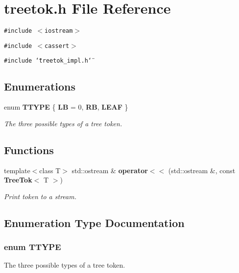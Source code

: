 \section{treetok.h File Reference}
\label{treetok_8h}
{\tt \#include $<$iostream$>$}\par
{\tt \#include $<$cassert$>$}\par
{\tt \#include \char`\"{}treetok\_\-impl.h\char`\"{}}\par
\subsection*{Enumerations}
\begin{CompactItemize}
\item 
enum {\bf TTYPE} \{ {\bf LB} =  0, 
{\bf RB}, 
{\bf LEAF}
 \}
\begin{CompactList}\small\item\em The three possible types of a tree token. \item\end{CompactList}\end{CompactItemize}
\subsection*{Functions}
\begin{CompactItemize}
\item 
template$<$class T$>$ std::ostream \& {\bf operator$<$$<$} (std::ostream \&, const {\bf Tree\-Tok}$<$ T $>$)
\begin{CompactList}\small\item\em Print token to a stream. \item\end{CompactList}\end{CompactItemize}


\subsection{Enumeration Type Documentation}
\subsubsection{\setlength{\rightskip}{0pt plus 5cm}enum {\bf TTYPE}}\label{treetok_8h_a4}


The three possible types of a tree token. 

